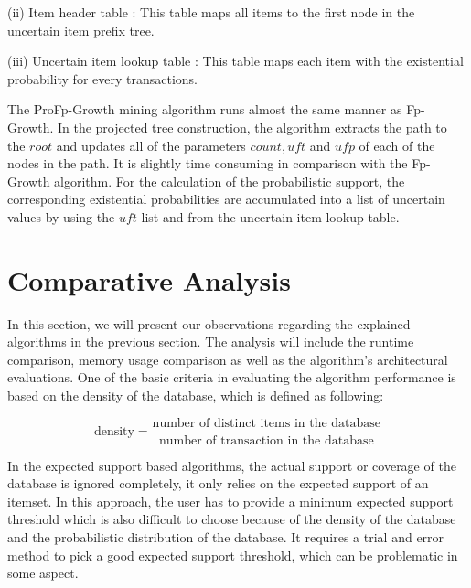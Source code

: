 (ii) Item header table : This table maps all items to the first node in the uncertain item prefix tree.

(iii) Uncertain item lookup table : This table maps each item with the existential probability for every transactions.

The ProFp-Growth mining algorithm runs almost the same manner as Fp-Growth. In the projected tree construction, the algorithm extracts the path to the $root$ and updates all of the parameters $count, uft$ and $ufp$ of each of the nodes in the path. It is slightly time consuming in comparison with the Fp-Growth algorithm. For the calculation of the probabilistic support, the corresponding existential probabilities are accumulated into a list of uncertain values by using the $uft$ list and from the uncertain item lookup table.

\section{Comparative Analysis}
In this section, we will present our observations regarding  the explained algorithms in the previous section. The analysis will include the runtime comparison, memory usage comparison as well as the algorithm's architectural evaluations. One of the basic criteria in evaluating the algorithm performance is based on the density of the database, which is defined as following:
 
 \[ \textrm{density} = \frac{\textrm{number of distinct items in the database}}{\textrm{number of transaction in the database}}\]
 
In the expected support based algorithms, the actual support or coverage of the database is ignored completely, it only relies on the expected support of an itemset. In this approach, the user has to provide a minimum expected support threshold which is also difficult to choose because of the density of the database and the probabilistic distribution of the database. It requires a trial and error method to pick a good expected support threshold, which can be problematic in some aspect.

